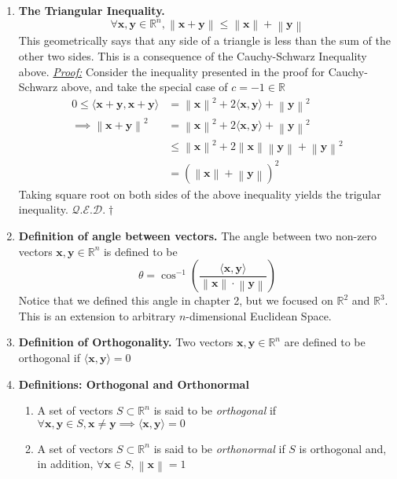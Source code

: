 \documentclass[oneside, 12pt]{book}
\newcommand{\settag}[1]{\renewcommand{\theenumi}{#1}}
\newcommand{\R}{\mathbb{R}}
\newcommand{\qed}{\hfill $\mathcal{Q}.\mathcal{E}.\mathcal{D}.\dagger$}
\newcommand{\tbf}[1]{\textbf{#1}}
\newcommand{\tit}[1]{\textit{#1}}
\newcommand{\proof}{\tit{\underline{Proof:}}} %
\newcommand{\norm}[1]{\left\lVert#1\right\rVert}
\newcommand{\para}[1]{\item \tbf{#1}}
\newcommand{\vx}{\mathbf{x}}
\newcommand{\vy}{\mathbf{y}}
\begin{document}
\begin{enumerate}
    \settag{4.3.4-(2)}
    \para{The Triangular Inequality.}
    \begin{equation*}
        \forall \vx, \vy \in \R^n, \norm{\vx + \vy}\leq \norm{\vx} + \norm{\vy}
    \end{equation*}
    This geometrically says that any side of a triangle is less than the sum of the other 
    two sides. This is a consequence of the Cauchy-Schwarz Inequality above.\newline
    \proof \newline
    Consider the inequality presented in the proof for Cauchy-Schwarz above, and take the special
    case of $c = -1\in\R$
    \begin{align*}
        0 \leq \langle \vx + \vy,\vx+\vy \rangle &= \norm{\vx}^2 + 2\langle \vx,\vy\rangle + \norm{\vy}^2 \\
        \implies \norm{\vx+\vy}^2 &= \norm{\vx}^2 + 2\langle \vx,\vy\rangle + \norm{\vy}^2 \\
        &\leq \norm{\vx}^2 + 2\norm{\vx}\norm{\vy} + \norm{\vy}^2 \\
        &= \left(\norm{\vx} +\norm{\vy}\right)^2
    \end{align*}
    Taking square root on both sides of the above inequality yields the trigular inequality. \qed
    
    \settag{4.3.5}
    \para{Definition of angle between vectors.} The angle between two non-zero vectors 
    $\vx,\vy \in \R^n$ is defined to be
    \begin{equation*}
        \theta = \cos^{-1}\left(\frac{\langle\vx,\vy\rangle}{\norm{\vx} \cdot \norm{\vy}}\right)
    \end{equation*}
    Notice that we defined this angle in chapter 2, but we focused on $\R^2$ and $\R^3$. 
    This is an extension to arbitrary $n$-dimensional Euclidean Space.
    
    \settag{4.3.7}
    \para{Definition of Orthogonality.} Two vectors $\vx,\vy \in \R^n$ are defined to be 
    orthogonal if $\langle \vx,\vy\rangle = 0$
    
    \settag{4.3.9}
    \para{Definitions: Orthogonal and Orthonormal}
    \begin{enumerate}
        \item A set of vectors $S\subset \R^n$ is said to be \tit{orthogonal} if $\forall 
        \vx,\vy \in S, \vx \neq \vy \implies \langle \vx,\vy\rangle = 0$
        \item A set of vectors $S\subset \R^n$ is said to be \tit{orthonormal} if $S$ 
        is orthogonal and, in addition, $\forall \vx \in S, \norm{\vx} = 1$
    \end{enumerate}
    

\end{enumerate}
\end{document}
